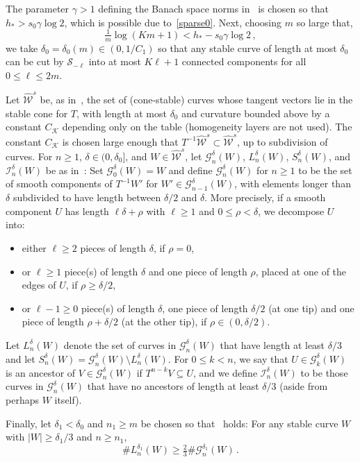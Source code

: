 \documentclass[10pt]{amsart}
\theoremstyle{definition}\newtheorem{defi}[theo]{Definition}\newtheorem{rema}[theo]{Remark}\newtheorem{exam}[theo]{Example}\newtheorem{exem}[theo]{Example}\newtheorem{nota}[theo]{Notation}
\newcommand{\cG}{\mathcal{G}}
\newcommand{\cI}{\mathcal{I}}
\newcommand{\cK}{\mathcal{K}}
\newcommand{\cS}{\mathcal{S}}
\newcommand{\cW}{\mathcal{W}}
\newcommand{\hW}{\widehat{\cW}}
\begin{document}
The parameter $\gamma >1$ defining the Banach space norms in~\cite{Ca} is chosen so that $h_* > s_0 \gamma \log 2$, which is possible due to~\eqref{sparse0}. Next, choosing $m$ so large that,
\[
\tfrac 1m \log (Km+1) < h_* - s_0 \gamma \log 2 \,,
\]
we take $\delta_0 = \delta_0(m) \in (0,1/C_1)$ so that any stable curve of length at most $\delta_0$ can be cut by $\cS_{-\ell}$ into at most $K\ell+1$ connected components for all $0 \le \ell \le 2m$.


Let $\hW^s$ be, as in~\cite[\S~5]{BD1}, the set of (cone-stable) curves whose tangent vectors lie in the stable cone for $T$, with length at most $\delta_0$ and curvature bounded above by a constant $C_{\cK}$ depending only on the table (homogeneity layers are not used). The constant $C_{\cK}$ is chosen large enough that $T^{-1} \hW^s \subset \hW^s$, up to subdivision of curves. For $n\ge 1$, $\delta \in (0,\delta_0]$, and $W\in \hW^s$, let $\cG_{n}^{ \delta}(W)$, $L_{n}^{ \delta}(W)$, $S_{n}^{ \delta}(W)$, and $\cI_n^\delta(W)$ be as in~\cite[\S~5]{BD1}: Set $\cG^\delta_0(W) = W$ and define $\cG_n^\delta(W)$ for $n\ge 1$ to be the set of smooth components of $T^{-1}W'$ for $W' \in \cG^\delta_{n-1}(W)$, with elements longer than $\delta$ subdivided to have length between $\delta/2$ and $\delta$. More precisely, if a smooth component $U$ has length $\ell \delta + \rho$ with $\ell \ge 1$ and $0 \le \rho<\delta$, we decompose $U$ into:
\begin{itemize}
\item either $\ell\ge 2$ pieces of length $\delta$, if $\rho=0$,
\item or $\ell\ge 1$ piece(s) of length $\delta$ and one piece of length $\rho$, placed at one of the edges of $U$, if $\rho\ge\delta/2$,
\item or $\ell-1\ge 0$ piece(s) of length $\delta$, one piece of length $\delta/2$ (at one tip) and one piece of length $\rho+\delta/2$ (at the other tip), if $\rho\in (0, \delta/2)$.
\end{itemize}

Let $L_n^{\delta}(W)$ denote the set of curves in $\cG_n^{\delta}(W)$ that have length at least $\delta/3$ and let $S_n^\delta(W) = \cG_n^\delta(W) \setminus L_n^\delta(W)$. For $0\le k<n$, we say that $U \in \cG_k^\delta(W)$ is an ancestor of $V \in \cG_n^\delta(W)$ if $T^{n-k}V \subseteq U$, and we define $\cI_n^\delta(W)$ to be those curves in $\cG_n^\delta(W)$ that have no ancestors of length at least $\delta/3$ (aside from perhaps $W$ itself).

Finally, let $\delta_1< \delta_0$ and $n_1 \ge m$ be chosen so that~\cite[eq.~(5.6)]{BD1} holds: For any stable curve $W$ with $|W| \ge \delta_1/3$ and $n \ge n_1$,
\begin{equation}\label{defn1}
\# L_n^{\delta_1}(W) \ge \tfrac 23 \# \cG_n^{\delta_1}(W) \,.
\end{equation}
\end{document}
